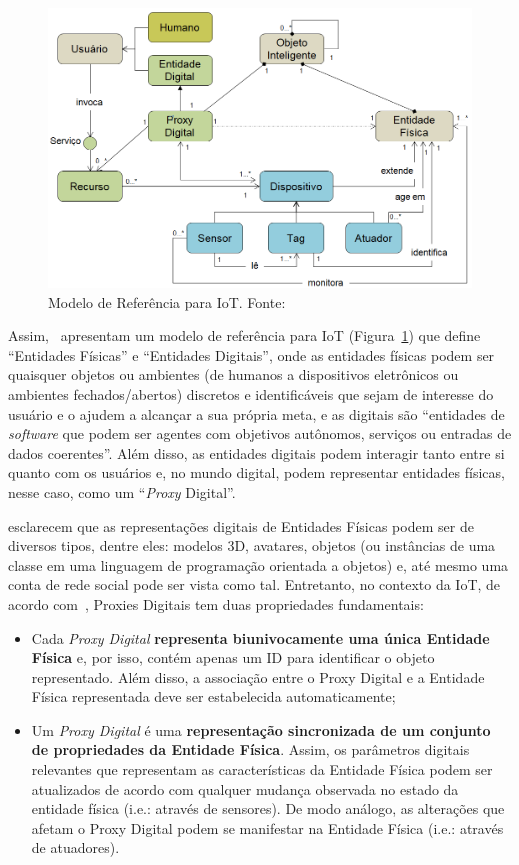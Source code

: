 \begin{figure}[htb]
	\centering
	\includegraphics[width=0.9\linewidth]{chapters/background/arquitetura_IoT.png}
	\caption{Modelo de Referência para IoT. Fonte:~\cite{serbanati:2011}}
	\label{fig:modeloiot}
\end{figure}

Assim,~\cite{serbanati:2011} apresentam um modelo de referência para IoT (Figura~\ref{fig:modeloiot}) que define ``Entidades Físicas'' e ``Entidades Digitais'', onde as entidades físicas podem ser quaisquer objetos ou ambientes (de humanos a dispositivos eletrônicos ou ambientes fechados/abertos) discretos e identificáveis que sejam de interesse do usuário e o ajudem a alcançar a sua própria meta, e as digitais são ``entidades de \textit{software} que podem ser agentes com objetivos autônomos, serviços ou entradas de dados coerentes''. Além disso, as entidades digitais podem interagir tanto entre si quanto com os usuários e, no mundo digital, podem representar entidades físicas, nesse caso, como um ``\textit{Proxy} Digital''.

\cite{serbanati:2011} esclarecem que as representações digitais de Entidades Físicas podem ser de diversos tipos, dentre eles: modelos 3D, avatares, objetos (ou instâncias de uma classe em uma linguagem de programação orientada a objetos) e, até mesmo uma conta de rede social pode ser vista como tal. Entretanto, no contexto da IoT, de acordo com~\cite{serbanati:2011}, Proxies Digitais tem duas propriedades fundamentais:

\begin{itemize}
	\item Cada \textit{Proxy Digital} \textbf{representa biunivocamente uma única Entidade Física} e, por isso, contém apenas um ID para identificar o objeto representado. Além disso, a associação entre o Proxy Digital e a Entidade Física representada deve ser estabelecida automaticamente;
	\item Um \textit{Proxy Digital} é uma \textbf{representação sincronizada de um conjunto de propriedades da Entidade Física}. Assim, os parâmetros digitais relevantes que representam as características da Entidade Física podem ser atualizados de acordo com qualquer mudança observada no estado da entidade física (i.e.: através de sensores). De modo análogo, as alterações que afetam o Proxy Digital podem se manifestar na Entidade Física (i.e.: através de atuadores).
\end{itemize}


